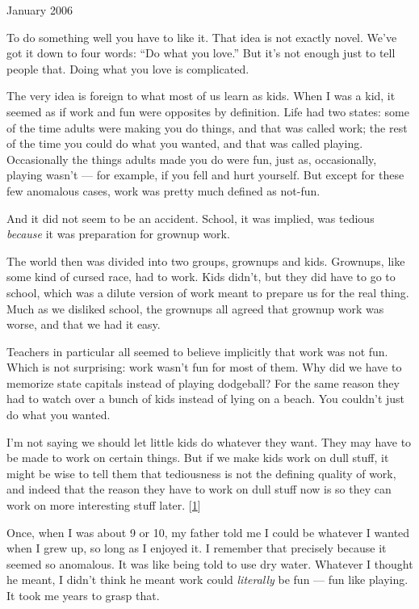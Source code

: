 January 2006

To do something well you have to like it. That idea is not exactly
novel. We've got it down to four words: ``Do what you love.'' But it's
not enough just to tell people that. Doing what you love is complicated.

The very idea is foreign to what most of us learn as kids. When I was a
kid, it seemed as if work and fun were opposites by definition. Life had
two states: some of the time adults were making you do things, and that
was called work; the rest of the time you could do what you wanted, and
that was called playing. Occasionally the things adults made you do were
fun, just as, occasionally, playing wasn't --- for example, if you fell
and hurt yourself. But except for these few anomalous cases, work was
pretty much defined as not-fun.

And it did not seem to be an accident. School, it was implied, was
tedious \emph{because} it was preparation for grownup work.

The world then was divided into two groups, grownups and kids. Grownups,
like some kind of cursed race, had to work. Kids didn't, but they did
have to go to school, which was a dilute version of work meant to
prepare us for the real thing. Much as we disliked school, the grownups
all agreed that grownup work was worse, and that we had it easy.

Teachers in particular all seemed to believe implicitly that work was
not fun. Which is not surprising: work wasn't fun for most of them. Why
did we have to memorize state capitals instead of playing dodgeball? For
the same reason they had to watch over a bunch of kids instead of lying
on a beach. You couldn't just do what you wanted.

I'm not saying we should let little kids do whatever they want. They may
have to be made to work on certain things. But if we make kids work on
dull stuff, it might be wise to tell them that tediousness is not the
defining quality of work, and indeed that the reason they have to work
on dull stuff now is so they can work on more interesting stuff later.
{[}\hyperref[f1n]{1}{]}

Once, when I was about 9 or 10, my father told me I could be whatever I
wanted when I grew up, so long as I enjoyed it. I remember that
precisely because it seemed so anomalous. It was like being told to use
dry water. Whatever I thought he meant, I didn't think he meant work
could \emph{literally} be fun --- fun like playing. It took me years to
grasp that.

